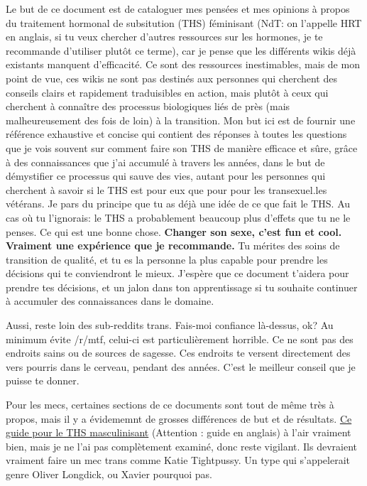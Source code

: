 \documentclass{article}
\begin{document}
Le but de ce document est de cataloguer mes pensées et mes opinions à propos du traitement hormonal de subsitution (THS) féminisant (NdT: on l'appelle HRT en anglais, si tu veux chercher d'autres ressources sur les hormones, je te recommande d'utiliser plutôt ce terme), car je pense que les différents wikis déjà existants manquent d'efficacité. Ce sont des ressources inestimables, mais de mon point de vue, ces wikis ne sont pas destinés aux personnes qui cherchent des conseils clairs et rapidement traduisibles en action, mais plutôt à ceux qui cherchent à connaître des processus biologiques liés de près (mais malheureusement des fois de loin) à la transition. Mon but ici est de fournir une référence exhaustive et concise qui contient des réponses à toutes les questions que je vois souvent sur comment faire son THS de manière efficace et sûre, grâce à des connaissances que j'ai accumulé à travers les années, dans le but de démystifier ce processus qui sauve des vies, autant pour les personnes qui cherchent à savoir si le THS est pour eux que pour pour les transexuel.les vétérans. Je pars du principe que tu as déjà une idée de ce que fait le THS. Au cas où tu l'ignorais: le THS a probablement beaucoup plus d'effets que tu ne le penses. Ce qui est une bonne chose. \textbf{Changer son sexe, c'est fun et cool. Vraiment une expérience que je recommande.} Tu mérites des soins de transition de qualité, et tu es la personne la plus capable pour prendre les décisions qui te conviendront le mieux. J'espère que ce document t'aidera pour prendre tes décisions, et un jalon dans ton apprentissage si tu souhaite continuer à accumuler des connaissances dans le domaine.

Aussi, reste loin des sub-reddits trans. Fais-moi confiance là-dessus, ok? Au minimum évite /r/mtf, celui-ci est particulièrement horrible. Ce ne sont pas des endroits sains ou de sources de sagesse. Ces endroits te versent directement des vers pourris dans le cerveau, pendant des années. C'est le meilleur conseil que je puisse te donner.

Pour les mecs, certaines sections de ce documents sont tout de même très à propos, mais il y a évidememnt de grosses différences de but et de résultats. \href{https://mega.nz/folder/cfwSmBbY#ify6kaueB8SdDD1v12t2Dw}{Ce guide pour le THS masculinisant} (Attention : guide en anglais) à l'air vraiment bien, mais je ne l'ai pas complètement examiné, donc reste vigilant. Ils devraient vraiment faire un mec trans comme Katie Tightpussy. Un type qui s'appelerait genre Oliver Longdick, ou Xavier pourquoi pas. 
\end{document}
